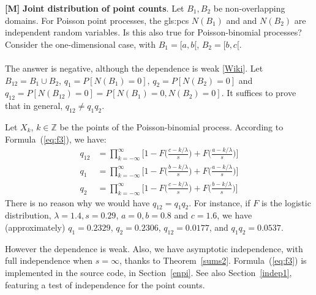 \documentclass[10pt]{article}
\begin{document}
\begin{Exercise}\label{exercise43} {\bf [M]}  {\bf Joint distribution of point counts}. Let $B_1, B_2$ be non-overlapping domains. For Poisson point processes, the 
\glspl{gls:pc} $N(B_1)$ and and $N(B_2)$ are independent random variables. Is this also true for Poisson-binomial processes? Consider the one-dimensional case, with $B_1=[a, b[$, $B_2=[b, c[$. \vspace{1ex} \\
 \vspace{1ex} \\
The answer is negative, although the dependence is weak [\href{https://en.wikipedia.org/wiki/Weakly_dependent_random_variables}{Wiki}]. Let $B_{12}=B_1\cup B_2$, 
$q_1=P[N(B_1)=0]$, $q_2=P[N(B_2)=0]$ and $q_{12}=P[N(B_{12})=0]=P[N(B_1)=0, N(B_2)=0]$. It suffices to prove that in general,
$q_{12}\neq q_1 q_2$. 

Let $X_k$, $k\in\mathbb{Z}$ be the points of the Poisson-binomial process. According to Formula~(\ref{eq:f3}), we have:
\begin{align}
q_{12} & =\prod_{k=-\infty}^\infty  \Big[1- F\Big(\frac{c-k/\lambda}{s}\Big) + F\Big(\frac{a-k/\lambda}{s}\Big)\Big] \nonumber \\
q_1 & = \prod_{k=-\infty}^\infty  \Big[1- F\Big(\frac{b-k/\lambda}{s}\Big) + F\Big(\frac{a-k/\lambda}{s}\Big)\Big]\nonumber \\
q_2 & = \prod_{k=-\infty}^\infty  \Big[1- F\Big(\frac{c-k/\lambda}{s}\Big) + F\Big(\frac{b-k/\lambda}{s}\Big)\Big]\nonumber
\end{align}
There is no reason why we would have $q_{12}=q_1q_2$. For instance, if $F$ is the logistic distribution, $\lambda=1.4, s=0.29$,
$a=0, b=0.8$ and $c=1.6$, we have (approximately) $q_{1}=0.2329$, $q_2=0.2306$, $q_{12}=0.0177$, and $q_1q_2 = 0.0537$. 

However the dependence is weak. Also, we have asymptotic independence, with full independence when $s=\infty$, thanks to
Theorem~\ref{sums2}. Formula~(\ref{eq:f3}) is implemented in the source code, in Section~\ref{enpi}. See also Section~\ref{indep1}, featuring
 a test of independence for the point counts.
\end{Exercise}
\end{document}
